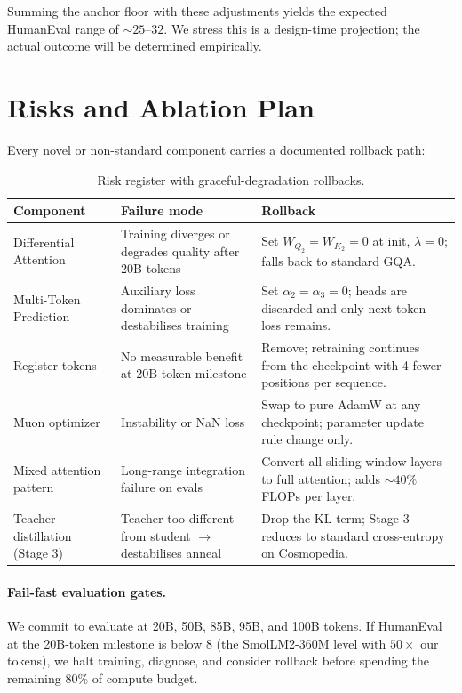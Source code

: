 \documentclass[11pt,a4paper]{article}
\theoremstyle{definition}
\theoremstyle{remark}
\begin{document}
Summing the anchor floor with these adjustments yields the expected
HumanEval range of $\sim 25$--$32$. We stress this is a design-time
projection; the actual outcome will be determined empirically.

\section{Risks and Ablation Plan}
\label{sec:risks}

Every novel or non-standard component carries a documented rollback path:

\begin{table}[h]
\centering
\small
\begin{tabular}{p{4cm} p{4cm} p{6cm}}
\toprule
\textbf{Component} & \textbf{Failure mode} & \textbf{Rollback} \\
\midrule
Differential Attention & Training diverges or degrades quality after 20B tokens & Set $W_{Q_2} = W_{K_2} = 0$ at init, $\lambda = 0$; falls back to standard GQA. \\
Multi-Token Prediction & Auxiliary loss dominates or destabilises training & Set $\alpha_2 = \alpha_3 = 0$; heads are discarded and only next-token loss remains. \\
Register tokens & No measurable benefit at 20B-token milestone & Remove; retraining continues from the checkpoint with 4 fewer positions per sequence. \\
Muon optimizer & Instability or NaN loss & Swap to pure AdamW at any checkpoint; parameter update rule change only. \\
Mixed attention pattern & Long-range integration failure on evals & Convert all sliding-window layers to full attention; adds $\sim 40\%$ FLOPs per layer. \\
Teacher distillation (Stage 3) & Teacher too different from student $\to$ destabilises anneal & Drop the KL term; Stage 3 reduces to standard cross-entropy on Cosmopedia. \\
\bottomrule
\end{tabular}
\caption{Risk register with graceful-degradation rollbacks.}
\end{table}

\paragraph{Fail-fast evaluation gates.} We commit to evaluate at 20B, 50B,
85B, 95B, and 100B tokens. If HumanEval at the 20B-token milestone is
below 8 (the SmolLM2-360M level with $50 \times$ our tokens), we halt training,
diagnose, and consider rollback before spending the remaining 80\% of
compute budget.
\end{document}
